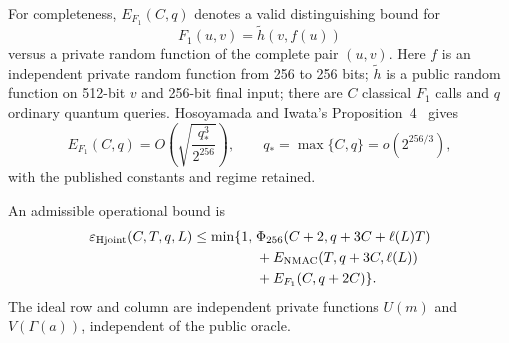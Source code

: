 For completeness, $E_{F_1}(C,q)$ denotes a valid distinguishing bound for
\[
 F_1(u,v)=\widetilde h(v,f(u))
\]
versus a private random function of the complete pair $(u,v)$.
Here $f$ is an independent private random function from 256 to 256 bits;
$\widetilde h$ is a public random function on 512-bit $v$ and 256-bit final
input; there are $C$ classical $F_1$ calls and $q$ ordinary quantum queries.
Hosoyamada and Iwata's Proposition~4~\cite{hmacqrom2021} gives
\[
 E_{F_1}(C,q)=
 O\!\left(\sqrt{\frac{q_*^3}{2^{256}}}\right),
 \qquad q_*=\max\{C,q\}=o(2^{256/3}),
\]
with the published constants and regime retained.

\begin{lemma}
\label{lem:appendix-joint-hmac}
An admissible operational bound is
\begin{equation}
\begin{split}
 \varepsilon_{\rm Hjoint}(C,T,q,L)\le\min\{1,\;&
 \Phi_{256}(C+2,q+3C+\ell(L)T)\\
 &+E_{\rm NMAC}(T,q+3C,\ell(L))\\
 &+E_{F_1}(C,q+2C)\}.
\end{split}
 \label{eq:appendix-joint-hmac}
\end{equation}
The ideal row and column are independent private functions
$U(m)$ and $V(\Gamma(a))$, independent of the public oracle.
\end{lemma}
